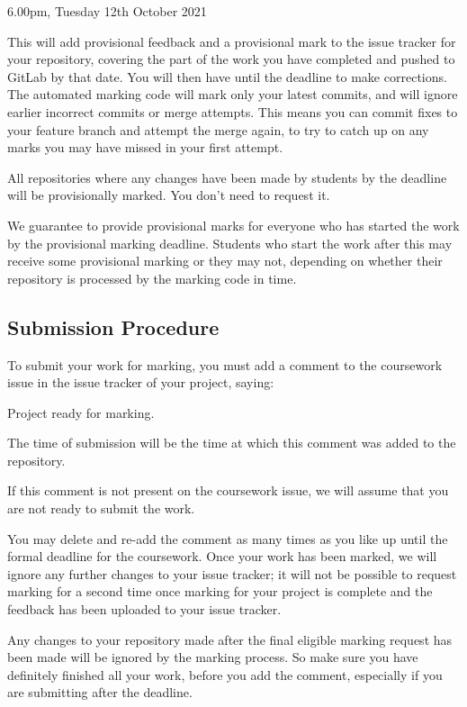 \documentclass[
]{book}
\newenvironment{Shaded}{\begin{snugshade}}{\end{snugshade}}
\newcommand{\NormalTok}[1]{#1}
\begin{document}
6.00pm, Tuesday 12th October 2021

This will add provisional feedback and a provisional mark to the issue tracker for your repository, covering the part of the work you have completed and pushed to GitLab by that date. You will then have until the deadline to make corrections. The automated marking code will mark only your latest commits, and will ignore earlier incorrect commits or merge attempts. This means you can commit fixes to your feature branch and attempt the merge again, to try to catch up on any marks you may have missed in your first attempt.

All repositories where any changes have been made by students by the deadline will be provisionally marked. You don't need to request it.

We guarantee to provide provisional marks for everyone who has started the work by the provisional marking deadline. Students who start the work after this may receive some provisional marking or they may not, depending on whether their repository is processed by the marking code in time.

\hypertarget{subproc}{%
\subsection{Submission Procedure}\label{subproc}}

To submit your work for marking, you must add a comment to the coursework issue in the issue tracker of your project, saying:

\begin{Shaded}
\begin{Highlighting}[]
\NormalTok{Project ready for marking.}
\end{Highlighting}
\end{Shaded}

The time of submission will be the time at which this comment was added to the repository.

If this comment is not present on the coursework issue, we will assume that you are not ready to submit the work.

You may delete and re-add the comment as many times as you like up until the formal deadline for the coursework. Once your work has been marked, we will ignore any further changes to your issue tracker; it will not be possible to request marking for a second time once marking for your project is complete and the feedback has been uploaded to your issue tracker.

Any changes to your repository made after the final eligible marking request has been made will be ignored by the marking process. So make sure you have definitely finished all your work, before you add the comment, especially if you are submitting after the deadline.
\end{document}
